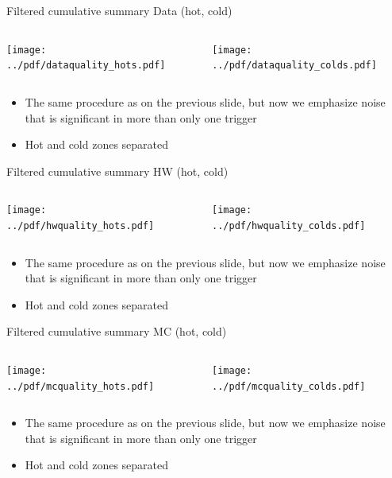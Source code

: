 \documentclass[9pt]{beamer}
\begin{document}
\begin{frame}[t]{Filtered cumulative summary Data (hot, cold)}
\begin{columns}[T]
  \begin{column}{.5\textwidth}
  \texttt{[image: ../pdf/dataquality\_hots.pdf]}
  \end{column}
  \begin{column}{.5\textwidth}
  \texttt{[image: ../pdf/dataquality\_colds.pdf]}
  \end{column}
\end{columns}
\begin{itemize}
 \item The same procedure as on the previous slide, but now we emphasize noise that is significant in more than only one trigger
 \item Hot and cold zones separated
\end{itemize}
\end{frame}

\begin{frame}[t]{Filtered cumulative summary HW (hot, cold)}
\begin{columns}[T]
  \begin{column}{.5\textwidth}
  \texttt{[image: ../pdf/hwquality\_hots.pdf]}
  \end{column}
  \begin{column}{.5\textwidth}
  \texttt{[image: ../pdf/hwquality\_colds.pdf]}
  \end{column}
\end{columns}
\begin{itemize}
 \item The same procedure as on the previous slide, but now we emphasize noise that is significant in more than only one trigger
 \item Hot and cold zones separated
\end{itemize}
\end{frame}

\begin{frame}[t]{Filtered cumulative summary MC (hot, cold)}
\begin{columns}[T]
  \begin{column}{.5\textwidth}
  \texttt{[image: ../pdf/mcquality\_hots.pdf]}
  \end{column}
  \begin{column}{.5\textwidth}
  \texttt{[image: ../pdf/mcquality\_colds.pdf]}
  \end{column}
\end{columns}
\begin{itemize}
 \item The same procedure as on the previous slide, but now we emphasize noise that is significant in more than only one trigger
 \item Hot and cold zones separated
\end{itemize}
\end{frame}
\end{document}
